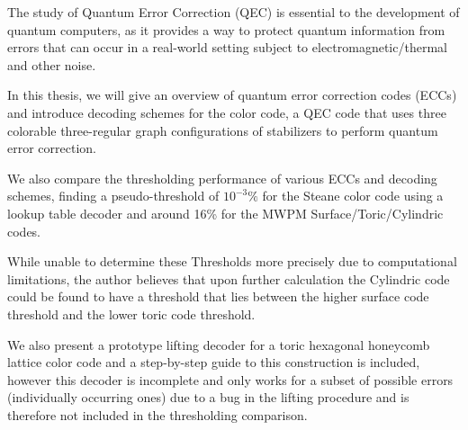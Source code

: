 The study of Quantum Error Correction (QEC) is essential to the development
of quantum computers, as it provides a way to protect quantum
information from errors that can occur in 
a real-world setting subject to electromagnetic/thermal and other noise.

In this thesis, we will give an overview of quantum error correction codes (ECCs) 
and introduce decoding schemes for the color code, a QEC code that uses
three colorable three-regular graph configurations of stabilizers
to perform quantum error correction.

We also compare the thresholding performance of various ECCs and decoding 
schemes, finding a pseudo-threshold of $10^{-3}\%$ for the Steane color code using a 
lookup table decoder and around 16\% for the MWPM Surface/Toric/Cylindric codes.

While unable to determine these Thresholds more precisely due to computational
limitations, the author believes that upon further calculation the Cylindric code
could be found to have a threshold that lies between the higher surface code threshold
and the lower toric code threshold.

We also present a prototype lifting decoder for a toric hexagonal 
honeycomb lattice color code and a step-by-step guide to this construction is 
included, however this decoder is incomplete and only works for a subset of 
possible errors (individually occurring ones) due to a bug in 
the lifting procedure and is therefore not included in the thresholding comparison.
